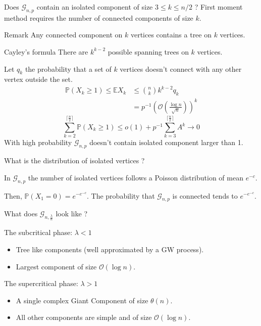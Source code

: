 \documentclass{beamer}
\begin{document}
	\begin{frame}
		Does $\mathcal{G}_{n,p}$ contain an isolated component of size $3 \leq k \leq n/2$ ? 
		First moment method requires the number of connected components of size $k$.
		\begin{block}{Remark}
			Any connected component on $k$ vertices contains a tree on $k$ vertices. 
		\end{block}
		\begin{theorem}{Cayley's formula}
			There are $k^{k-2}$ possible spanning trees on $k$ vertices.
		\end{theorem}
	\end{frame}
	\begin{frame}
		Let $q_k$ the probability that a set of $k$ vertices doesn't connect with any other vertex outside the set.
		\begin{align}
			\mathbb{P}(X_k \geq 1) \leq \mathbb{E} X_k 	&\leq \binom{n}{k}k^{k-2}q_k\\
									&= p^{-1}(\mathcal{O}(\frac{\log n}{\sqrt{n}}))^k
		\end{align}
		\begin{equation}
			\sum_{k=2}^{\lceil \frac{n}{2} \rceil} \mathbb{P}(X_k \geq 1) \leq o(1) + p^{-1}\sum_{k=3}^{\lceil \frac{n}{2} \rceil} A^k \longrightarrow 0
		\end{equation}
		With high probability $\mathcal{G}_{n,p}$ doesn't contain isolated component larger than 1.
	\end{frame}
	\begin{frame}
		What is the distribution of isolated vertices ?
		\begin{theorem}
			In $\mathcal{G}_{n,p}$ the number of isolated vertices follows a Poisson distribution of mean $e^{-c}$.
		\end{theorem}
		Then, $\mathbb{P}(X_1 = 0) = e^{-e^{-c}}$.
		\newline
		The probability that $\mathcal{G}_{n,p}$ is connected tends to $e^{-e^{-c}}$.
	\end{frame}
	\begin{frame}
		\titleframe{The phase transition}
		What does $\mathcal{G}_{n,\frac{\lambda}{n}}$ look like ?
		\begin{block}{The subcritical phase: $\lambda < 1$}
			\begin{itemize}
				\item Tree like components (well approximated by a GW process).
				\item Largest component of size $\mathcal{O}(\log n)$.
			\end{itemize}
		\end{block}
		\begin{block}{The supercritical phase: $\lambda>1$}
			\begin{itemize}
				\item A single complex Giant Component of size $\theta(n)$.
				\item All other components are simple and of size $\mathcal{O}(\log n)$.
			\end{itemize}
		\end{block}
	\end{frame}
	
\end{document}
